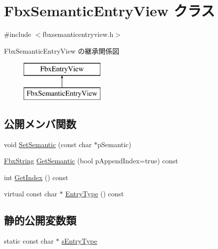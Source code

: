 \hypertarget{class_fbx_semantic_entry_view}{}\section{Fbx\+Semantic\+Entry\+View クラス}
\label{class_fbx_semantic_entry_view}


{\ttfamily \#include $<$fbxsemanticentryview.\+h$>$}

Fbx\+Semantic\+Entry\+View の継承関係図\begin{figure}[H]
\begin{center}
\leavevmode
\includegraphics[height=2.000000cm]{class_fbx_semantic_entry_view}
\end{center}
\end{figure}
\subsection*{公開メンバ関数}
\begin{DoxyCompactItemize}
\item 
void \hyperlink{class_fbx_semantic_entry_view_a602f170055f7dc100360d0d11bb88c56}{Set\+Semantic} (const char $\ast$p\+Semantic)
\item 
\hyperlink{class_fbx_string}{Fbx\+String} \hyperlink{class_fbx_semantic_entry_view_ac1419433cb4547f9cbd42e4855976e43}{Get\+Semantic} (bool p\+Append\+Index=true) const
\item 
int \hyperlink{class_fbx_semantic_entry_view_a9163df1576880dd1fa1922eeeb122dfd}{Get\+Index} () const
\item 
virtual const char $\ast$ \hyperlink{class_fbx_semantic_entry_view_afd242ecac3eaab584dffe108753aba1d}{Entry\+Type} () const
\end{DoxyCompactItemize}
\subsection*{静的公開変数類}
\begin{DoxyCompactItemize}
\item 
static const char $\ast$ \hyperlink{class_fbx_semantic_entry_view_a971315cc135c67cb4ca164a69fe6f6b2}{s\+Entry\+Type}
\end{DoxyCompactItemize}

